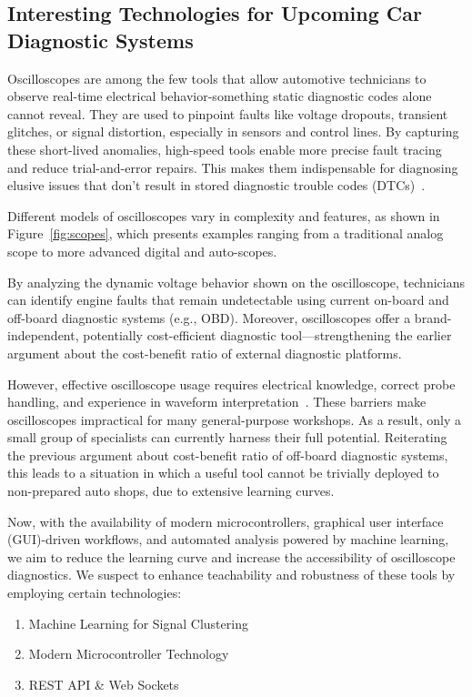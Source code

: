 \subsection{Interesting Technologies for Upcoming Car Diagnostic Systems}
Oscilloscopes are among the few tools that allow automotive technicians to observe real-time electrical behavior-something static diagnostic codes alone cannot reveal. 
They are used to pinpoint faults like voltage dropouts, transient glitches, or signal distortion, especially in sensors and control lines.
By capturing these short-lived anomalies, high-speed tools enable more precise fault tracing and reduce trial-and-error repairs. 
This makes them indispensable for diagnosing elusive issues that don’t result in stored diagnostic trouble codes (DTCs)~\cite{vehicleempire2025, douzauto2024, automotivequest2025, fleetmaintenance2020}.

Different models of oscilloscopes vary in complexity and features, as shown in Figure~\ref{fig:scopes}, 
which presents examples ranging from a traditional analog scope to more advanced digital and auto-scopes.

By analyzing the dynamic voltage behavior shown on the oscilloscope, technicians can identify engine faults that remain undetectable using current on-board and off-board diagnostic systems (e.g., OBD).
Moreover, oscilloscopes offer a brand-independent, potentially cost-efficient diagnostic tool—strengthening the earlier argument about the cost-benefit ratio of external diagnostic platforms.

However, effective oscilloscope usage requires electrical knowledge, correct probe handling, and experience in waveform interpretation~\cite{rohde2024, autoditex2023, pico2021, mechanic2024}. 
These barriers make oscilloscopes impractical for many general-purpose workshops. 
As a result, only a small group of specialists can currently harness their full potential. 
Reiterating the previous argument about cost-benefit ratio of off-board diagnostic systems, 
this leads to a situation in which a useful tool cannot be trivially deployed to non-prepared auto shops, due to extensive learning curves.

Now, with the availability of modern microcontrollers, graphical user interface (GUI)-driven workflows, and automated analysis powered by machine learning, 
we aim to reduce the learning curve and increase the accessibility of oscilloscope diagnostics. 
We suspect to enhance teachability and robustness of these tools by employing certain technologies:
\begin{enumerate}[label=\alph*)]
  \item Machine Learning for Signal Clustering
  \item Modern Microcontroller Technology
  \item REST API \& Web Sockets
\end{enumerate}

